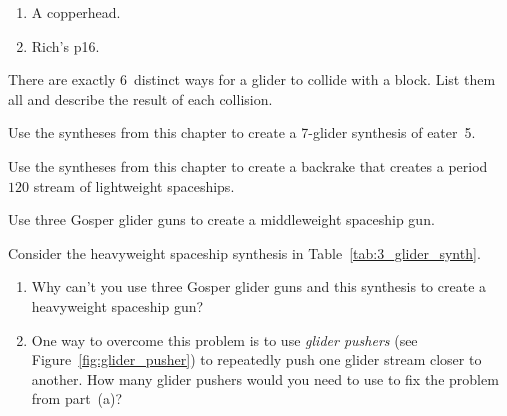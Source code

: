 \begin{multicols}{2}
\begin{problem}
\begin{enumerate}[label=(\alph*),series=exer_glider_cleanup]
		\item A copperhead.
		
		\item Rich's p16.
	\end{enumerate}
\end{problem}


\mfilbreak


\begin{problem}\label{exer:glider_block_collisions}
	There are exactly $6$~distinct ways for a glider to collide with a block. List them all and describe the result of each collision.
\end{problem}


\mfilbreak


\begin{problem}\label{exer:twit_synthesis}
	Use the syntheses from this chapter to create a 7-glider synthesis of eater~5.
\end{problem}


\mfilbreak


\begin{problem}\label{exer:p60_lwss_backrake}
	Use the syntheses from this chapter to create a backrake that creates a period~$120$ stream of lightweight spaceships.
\end{problem}


\mfilbreak


\begin{problem}\label{exer:mwss_gun}
	Use three Gosper glider guns to create a middleweight spaceship gun.
\end{problem}


\mfilbreak


\begin{problem}\label{exer:hwss_gun}
	Consider the heavyweight spaceship synthesis in Table~\ref{tab:3_glider_synth}.
	\begin{enumerate}[label=(\alph*)]
		\item Why can't you use three Gosper glider guns and this synthesis to create a heavyweight spaceship gun?
		
		\item One way to overcome this problem is to use \emph{glider pushers} (see Figure~\ref{fig:glider_pusher}) to repeatedly push one glider stream closer to another. How many glider pushers would you need to use to fix the problem from part~(a)?\medskip
		

\end{enumerate}
\end{problem}
\end{multicols}

